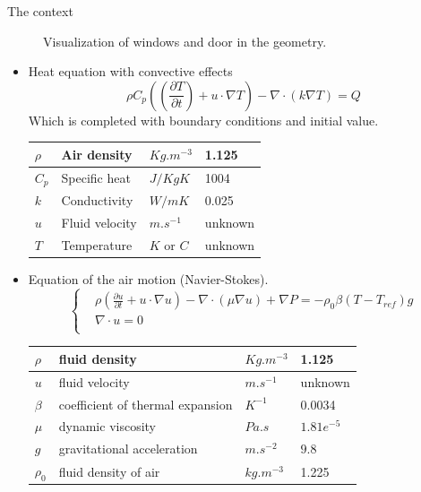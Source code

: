 \begin{frame}[allowframebreaks]{The context}
\begin{minipage}{0.48\linewidth}
\begin{figure}
        \caption{Visualization of windows and door in the geometry.}
    \end{figure}
\end{minipage}
\newpage
\begin{itemize}
    \item Heat equation with convective effects\\
    $$\rho C_p((\frac{\partial T}{\partial t})+u \cdot \nabla T)-\nabla \cdot (k \nabla T)=Q$$
    Which is completed with boundary conditions and initial value.
    \newline
    \newline
\renewcommand{\arraystretch}{1.7}
\begin{tabular}{|R{2cm}|C{2.5cm}|L{2.5cm}|L{2.5cm}|}
\hline
$\rho$ & Air density & $Kg.m^
{-3}$ & 1.125  \\[0.5cm]
\hline
$C_p$ & Specific heat & $J/KgK$ & 1004 \\[0.5cm]
\hline
$k$ & Conductivity & $W/mK$ & 0.025  \\[0.5cm]
\hline
$u$ & Fluid velocity & $m.s^{-1}$ & unknown \\[0.5cm]
\hline
$T$ & Temperature & $K$ or $C$ & unknown \\[0.5cm]
\hline
\end{tabular}
\newpage
\item Equation of the air motion (Navier-Stokes).
 $$\left\{\begin{aligned} 
        &\rho (\frac{\partial u}{\partial t}+u\cdot \nabla u)-\nabla \cdot (\mu \nabla u)+\nabla P =-\rho_0 \beta(T-T_{ref})g\\
        &\nabla \cdot u=0 \\
    \end{aligned}\right.$$
\renewcommand{\arraystretch}{1.5}
\begin{tabular}{|R{1cm}|C{5cm}|L{1.5cm}|L{1.5cm}|}
\hline
$\rho$ & fluid density & $Kg.m^
{-3}$ & 1.125 \\[0.7cm]
\hline
$u$ & fluid velocity & $m.s^{-1}$ & unknown \\[0.7cm]
\hline
$\beta$ & coefficient of thermal expansion & $K^
{-1}$ &  0.0034 \\[0.7cm]
\hline
$\mu$ & dynamic viscosity & $Pa.s$ & $1.81e^{-5}$\\[0.7cm]
\hline
$g$ & gravitational acceleration & $m.s^{-2}$ & $9.8$\\[0.7cm]
\hline
$\rho_0$ & fluid density of air & $kg .m^{-3}$ & 1.225\\[0.7cm]
\hline
\end{tabular}


\end{itemize}
\end{frame}
